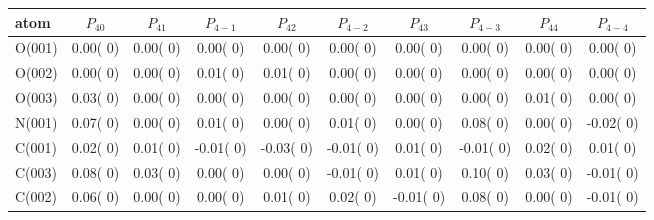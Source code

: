 \documentclass[a4]{article}
\begin{document}
 \vspace{2.0 cm}
 
 \begin{tabular}{||l|c|c|c|c|c|c|c|c|c||} \hline
 atom & $P_{40}$
  & $P_{41}$ & $P_{4-1}$ & $P_{42}$ & $P_{4-2}$
  & $P_{43}$ & $P_{4-3}$ & $P_{44}$ & $P_{4-4}$
  \\ \hline
O(001)  
 &  0.00( 0) &  0.00( 0) &  0.00( 0) &  0.00( 0) &  0.00( 0) &  0.00( 0) &  0.00( 0) &  0.00( 0) &  0.00( 0) \\
O(002)  
 &  0.00( 0) &  0.00( 0) &  0.01( 0) &  0.01( 0) &  0.00( 0) &  0.00( 0) &  0.00( 0) &  0.00( 0) &  0.00( 0) \\
O(003)  
 &  0.03( 0) &  0.00( 0) &  0.00( 0) &  0.00( 0) &  0.00( 0) &  0.00( 0) &  0.00( 0) &  0.01( 0) &  0.00( 0) \\
N(001)  
 &  0.07( 0) &  0.00( 0) &  0.01( 0) &  0.00( 0) &  0.01( 0) &  0.00( 0) &  0.08( 0) &  0.00( 0) & -0.02( 0) \\
C(001)  
 &  0.02( 0) &  0.01( 0) & -0.01( 0) & -0.03( 0) & -0.01( 0) &  0.01( 0) & -0.01( 0) &  0.02( 0) &  0.01( 0) \\
C(003)  
 &  0.08( 0) &  0.03( 0) &  0.00( 0) &  0.00( 0) & -0.01( 0) &  0.01( 0) &  0.10( 0) &  0.03( 0) & -0.01( 0) \\
C(002)  
 &  0.06( 0) &  0.00( 0) &  0.00( 0) &  0.01( 0) &  0.02( 0) & -0.01( 0) &  0.08( 0) &  0.00( 0) & -0.01( 0) \\
 \hline
 \end{tabular}
 
\end{document}
